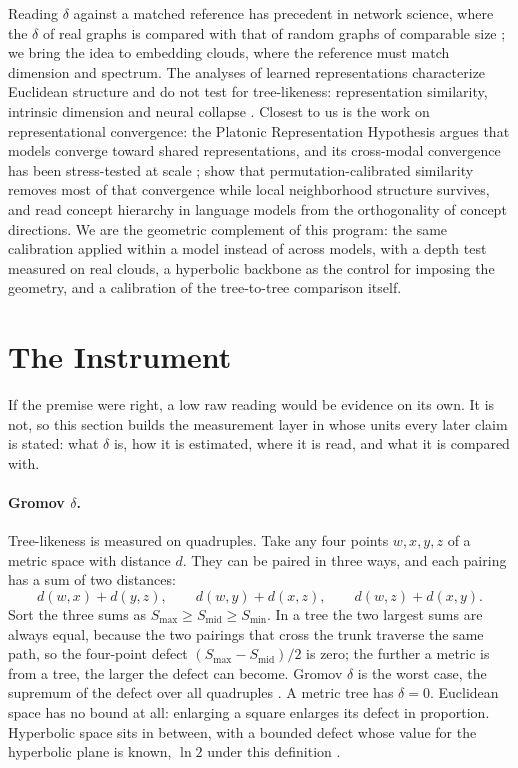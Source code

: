\documentclass{article} %
\begin{document}
Reading $\delta$ against a matched reference has precedent in network science, where the $\delta$ of real graphs is compared with that of random graphs of comparable size \citep{narayan2011curvature, kennedy2013hyperbolicity, adcock2013treelike}; we bring the idea to embedding clouds, where the reference must match dimension and spectrum. The analyses of learned representations characterize Euclidean structure and do not test for tree-likeness: representation similarity, intrinsic dimension and neural collapse \citep{kornblith2019cka, ansuini2019intrinsic, pope2021intrinsic, papyan2020prevalence}. Closest to us is the work on representational convergence: the Platonic Representation Hypothesis \citep{huh2024platonic} argues that models converge toward shared representations, and its cross-modal convergence has been stress-tested at scale \citep{koepke2026cave}; \citet{groger2026aristotelian} show that permutation-calibrated similarity removes most of that convergence while local neighborhood structure survives, and \citet{park2024geometry} read concept hierarchy in language models from the orthogonality of concept directions. We are the geometric complement of this program: the same calibration applied within a model instead of across models, with a depth test measured on real clouds, a hyperbolic backbone as the control for imposing the geometry, and a calibration of the tree-to-tree comparison itself.


\section{The Instrument}
\label{sec:instrument}


If the premise were right, a low raw reading would be evidence on its own. It is not, so this section builds the measurement layer in whose units every later claim is stated: what $\delta$ is, how it is estimated, where it is read, and what it is compared with.

\paragraph{Gromov $\delta$.} Tree-likeness is measured on quadruples. Take any four points $w,x,y,z$ of a metric space with distance $d$. They can be paired in three ways, and each pairing has a sum of two distances:
\begin{equation}
d(w,x)+d(y,z),\qquad d(w,y)+d(x,z),\qquad d(w,z)+d(x,y).
\label{eq:pairings}
\end{equation}
Sort the three sums as $S_{\max}\ge S_{\mathrm{mid}}\ge S_{\min}$. In a tree the two largest sums are always equal, because the two pairings that cross the trunk traverse the same path, so the four-point defect $(S_{\max}-S_{\mathrm{mid}})/2$ is zero; the further a metric is from a tree, the larger the defect can become. Gromov $\delta$ is the worst case, the supremum of the defect over all quadruples \citep{Gromov1987}. A metric tree has $\delta=0$. Euclidean space has no bound at all: enlarging a square enlarges its defect in proportion. Hyperbolic space sits in between, with a bounded defect whose value for the hyperbolic plane is known, $\ln 2$ under this definition \citep{nica2016strong}.
\end{document}
